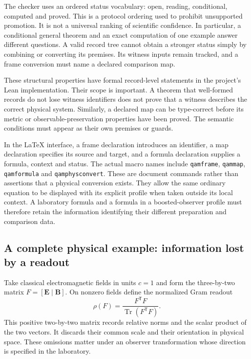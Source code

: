 The checker uses an ordered status vocabulary: open, reading,
conditional, computed and proved. This is a protocol ordering used
to prohibit unsupported promotion. It is not a universal ranking of
scientific confidence. In particular, a conditional general theorem
and an exact computation of one example answer different questions.
A valid record tree cannot obtain a stronger status simply by
combining or converting its premises. Its witness inputs remain
tracked, and a frame conversion must name a declared comparison map.

These structural properties have formal record-level statements in
the project's Lean implementation. Their scope is important. A
theorem that well-formed records do not lose witness identifiers
does not prove that a witness describes the correct physical system.
Similarly, a declared map can be type-correct before its metric or
observable-preservation properties have been proved. The semantic
conditions must appear as their own premises or guards.

In the LaTeX interface, a frame declaration introduces an identifier,
a map declaration specifies its source and target, and a formula
declaration supplies a formula, context and status. The actual macro
names include \texttt{qamframe}, \texttt{qammap},
\texttt{qamformula} and \texttt{qamphysconvert}. These are document
commands rather than assertions that a physical conversion exists.
They allow the same ordinary equation to be displayed with its
explicit profile when taken outside its local context. A laboratory
formula and a formula in a boosted-observer profile must therefore
retain the information identifying their different preparation and
comparison data.

\subsection{A complete physical example: information lost by a readout}
Take classical electromagnetic fields in units $c=1$ and form the
three-by-two matrix $F=[\boldsymbol E\mid\boldsymbol B]$. On nonzero
fields define the normalized Gram readout
\begin{equation}
 \rho(F)=\frac{F^{\mathsf T}F}{\operatorname{Tr}(F^{\mathsf T}F)}.
\end{equation}
This positive two-by-two matrix records relative norms and the scalar
product of the two vectors. It discards their common scale and their
orientation in physical space. These omissions matter under an
observer transformation whose direction is specified in the laboratory.

